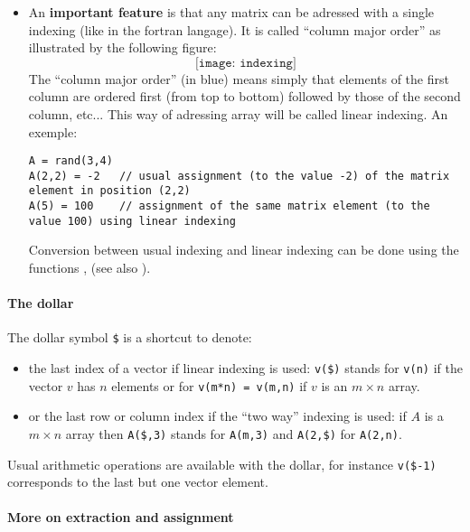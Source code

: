 \begin{itemize}
\item An {\bf important feature} is that any matrix can be adressed with
 a single indexing (like in the fortran langage). It is  called 
``column major order'' as illustrated by the
 following figure:    
$$
\texttt{[image: indexing]} 
$$
The ``column major order'' (in blue) means simply that elements of the first
column are ordered first (from top to bottom) followed by those of
the second column, etc... This way of adressing array will be called
linear indexing. An exemple:
\begin{Verbatim}
A = rand(3,4)
A(2,2) = -2   // usual assignment (to the value -2) of the matrix element in position (2,2)
A(5) = 100    // assignment of the same matrix element (to the value 100) using linear indexing
\end{Verbatim}
Conversion between usual indexing and linear indexing can be done 
using the functions ,  (see 
also ).
\end{itemize}

\paragraph{The dollar}

The dollar symbol \verb+$+ is a shortcut to denote:
\begin{itemize}
\item the last index of a vector if linear indexing is used: 
\verb+v($)+ stands for \verb+v(n)+ if the vector $v$ has $n$ elements
or for \verb+v(m*n) = v(m,n)+ if $v$ is an $m \times n$ array.
\item or the last row or column index if the ``two way'' indexing is
used: if $A$ is a $m \times n$ array then \verb+A($,3)+ stands for
\verb+A(m,3)+ and  \verb+A(2,$)+  for \verb+A(2,n)+.
\end{itemize}
Usual arithmetic operations are available with the dollar, for instance
\verb+v($-1)+ corresponds to the last but one vector element.


\paragraph{More on extraction and assignment}

